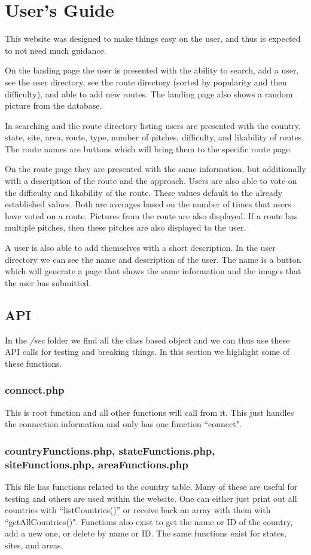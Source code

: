 \documentclass[12pt,letter]{article}
\begin{document}
\section{User's Guide}
This website was designed to make things easy on the user, and thus is expected
to not need much guidance. 

On the landing page the user is presented with the ability to search, add a
user, see the user directory, see the route directory (sorted by popularity and
then difficulty), and able to add new routes. The landing page also shows a
random picture from the database.

In searching and the route directory listing users are presented with the
country, state, site, area, route, type, number of pitches, difficulty, and
likability of routes. The route names are buttons which will bring them to the
specific route page. 

On the route page they are presented with the same information, but additionally
with a description of the route and the approach. Users are also able to vote on
the difficulty and likability of the route. These values default to the already
established values. Both are averages based on the number of times that users
have voted on a route. Pictures from the route are also displayed. If a route
has multiple pitches, then these pitches are also displayed to the user.

A user is also able to add themselves with a short description. In the user
directory we can see the name and description of the user. The name is a button
which will generate a page that shows the same information and the images that
the user has submitted.

\subsection{API}
In the \textit{/sec} folder we find all the class based object and we can thus
use these API calls for testing and breaking things. In this section we
highlight some of these functions.

\subsubsection{connect.php}
This is root function and all other functions will call from it. This just
handles the connection information and only has one function ``connect".

\subsubsection{countryFunctions.php, stateFunctions.php, siteFunctions.php,
areaFunctions.php}
This file has functions related to the country table. Many of these are useful
for testing and others are used within the website. One can either just print
out all countries with ``listCountries()'' or receive back an array with them
with ``getAllCountries()". Functions also exist to get the name or ID of the
country, add a new one, or delete by name or ID. The same functions exist for
states, sites, and areas. 
\end{document}
